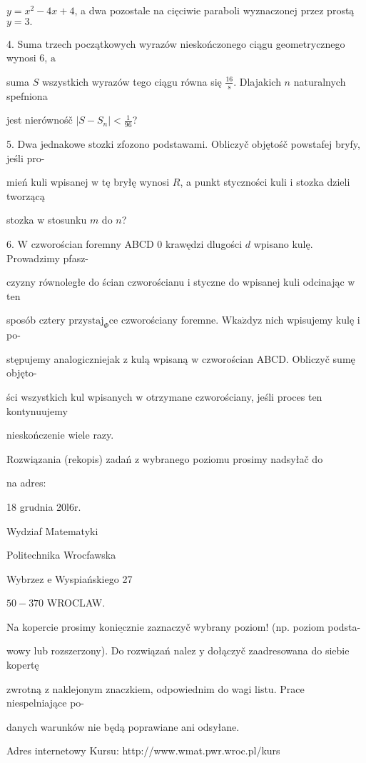 \documentclass[a4paper,12pt]{article}
\begin{document}
$y=x^{2}-4x+4$, a dwa pozostale na cięciwie paraboli wyznaczonej przez prostą $y=3.$

4. Suma trzech początkowych wyrazów nieskończonego ciągu geometrycznego wynosi 6, $\mathrm{a}$

suma $S$ wszystkich wyrazów tego ciągu równa się $\displaystyle \frac{16}{\mathrm{s}}$. Dlajakich $n$ naturalnych spefniona

jest nierównośč $|S-S_{n}|<\displaystyle \frac{1}{96}$?

5. Dwa jednakowe stozki zfozono podstawami. Obliczyč objętośč powstafej bryfy, jeśli pro-

mień kuli wpisanej $\mathrm{w}$ tę bryłę wynosi $R$, a punkt styczności kuli $\mathrm{i}$ stozka dzieli tworzącą

stozka $\mathrm{w}$ stosunku $m$ do $n$?

6. $\mathrm{W}$ czworościan foremny ABCD $0$ krawędzi dlugości $d$ wpisano kulę. Prowadzimy pfasz-

czyzny równoległe do ścian czworościanu $\mathrm{i}$ styczne do wpisanej kuli odcinając $\mathrm{w}$ ten

sposób cztery $\mathrm{p}\mathrm{r}\mathrm{z}\mathrm{y}\mathrm{s}\mathrm{t}\mathrm{a}\mathrm{j}_{\Phi}\mathrm{c}\mathrm{e}$ czworościany foremne. $\mathrm{W}\mathrm{k}\mathrm{a}\dot{\mathrm{z}}\mathrm{d}\mathrm{y}\mathrm{z}$ nich wpisujemy kulę $\mathrm{i}$ po-

stępujemy analogiczniejak $\mathrm{z}$ kulą wpisaną $\mathrm{w}$ czworościan ABCD. Obliczyč sumę objęto-

ści wszystkich kul wpisanych $\mathrm{w}$ otrzymane czworościany, jeśli proces ten kontynuujemy

nieskończenie wiele razy.

Rozwiązania (rekopis) zadań z wybranego poziomu prosimy nadsyłač do

na adres:

18 grudnia 20l6r.

Wydziaf Matematyki

Politechnika Wrocfawska

Wybrzez $\mathrm{e}$ Wyspiańskiego 27

$50-370$ WROCLAW.

Na kopercie prosimy $\underline{\mathrm{k}\mathrm{o}\mathrm{n}\mathrm{i}\mathrm{e}\mathrm{c}\mathrm{z}\mathrm{n}\mathrm{i}\mathrm{e}}$ zaznaczyč wybrany poziom! (np. poziom podsta-

wowy lub rozszerzony). Do rozwiązań nalez $\mathrm{y}$ dołączyč zaadresowana do siebie kopertę

zwrotną $\mathrm{z}$ naklejonym znaczkiem, odpowiednim do wagi listu. Prace niespelniające po-

danych warunków nie będą poprawiane ani odsyłane.

Adres internetowy Kursu: http://www.wmat.pwr.wroc.pl/kurs
\end{document}
